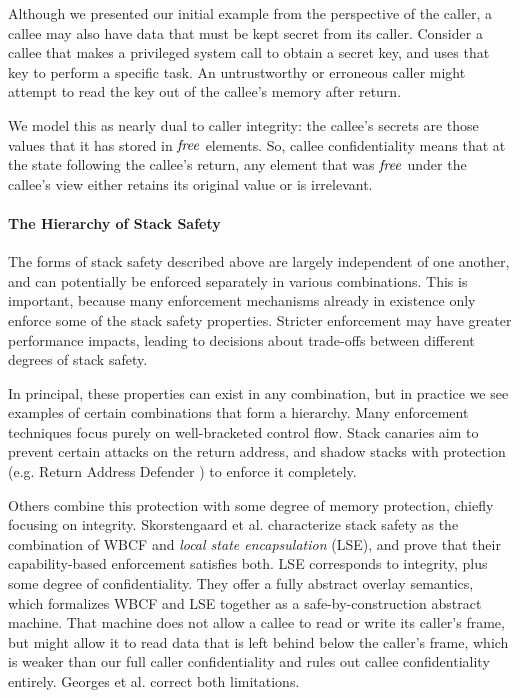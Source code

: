 \documentclass[10pt,conference]{ieeetran}%
\theoremstyle{definition}
\begin{document}
Although we presented our initial example from the perspective of the caller, a callee
may also have data that must be kept secret from its caller. Consider a callee that makes
a privileged system call to obtain a secret key, and uses that key to perform a specific
task. An untrustworthy or erroneous caller might attempt to read the key out of the callee's
memory after return.

We model this as nearly dual to caller integrity: the callee's secrets are those
values that it has stored in \(\mathit{free}\) elements. So, callee confidentiality means that
at the state following the callee's return, any element that was \(\mathit{free}\) under the
callee's view either retains its original value or is irrelevant.

\paragraph*{The Hierarchy of Stack Safety}

The forms of stack safety described above are largely independent of one another, and
can potentially be enforced separately in various combinations. This is important, because
many enforcement mechanisms already in existence only enforce some of the stack safety
properties. Stricter enforcement may have greater performance impacts, leading to decisions
about trade-offs between different degrees of stack safety.

In principal, these properties can exist in any combination, but in practice we see examples
of certain combinations that form a hierarchy. Many enforcement techniques focus purely on
well-bracketed control flow. Stack canaries aim to prevent certain attacks on the return
address, and shadow stacks with protection (e.g. Return Address Defender \cite{Chiueh2001RAD})
to enforce it completely.

Others combine this protection with some degree of memory protection,
chiefly focusing on integrity. Skorstengaard et al. \cite{SkorstengaardSTK} characterize stack
safety as the combination of WBCF and {\it local state encapsulation} (LSE), and prove that their
capability-based enforcement satisfies both. LSE corresponds to integrity, plus some degree of
confidentiality. They offer a fully abstract overlay semantics, which formalizes WBCF and LSE
together as a safe-by-construction abstract machine. That machine does not allow a callee to
read or write its caller's frame, but might allow it to read data that is left behind below
the caller's frame, which is weaker than our full caller confidentiality and rules out
callee confidentiality entirely. Georges et al. \cite{Georges22:TempsDesCerises} correct
both limitations.
\end{document}
